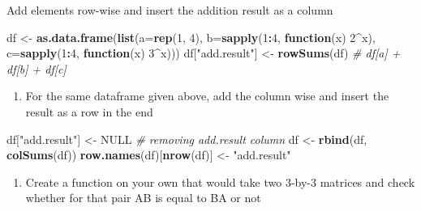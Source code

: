 \documentclass[]{article}
\newenvironment{Shaded}{\begin{snugshade}}{\end{snugshade}}
\newcommand{\CommentTok}[1]{\textcolor[rgb]{0.56,0.35,0.01}{\textit{#1}}}
\newcommand{\ControlFlowTok}[1]{\textcolor[rgb]{0.13,0.29,0.53}{\textbf{#1}}}
\newcommand{\DataTypeTok}[1]{\textcolor[rgb]{0.13,0.29,0.53}{#1}}
\newcommand{\DecValTok}[1]{\textcolor[rgb]{0.00,0.00,0.81}{#1}}
\newcommand{\KeywordTok}[1]{\textcolor[rgb]{0.13,0.29,0.53}{\textbf{#1}}}
\newcommand{\NormalTok}[1]{#1}
\newcommand{\OperatorTok}[1]{\textcolor[rgb]{0.81,0.36,0.00}{\textbf{#1}}}
\newcommand{\OtherTok}[1]{\textcolor[rgb]{0.56,0.35,0.01}{#1}}
\newcommand{\StringTok}[1]{\textcolor[rgb]{0.31,0.60,0.02}{#1}}
\providecommand{\tightlist}{%
  \setlength{\itemsep}{0pt}\setlength{\parskip}{0pt}}
\begin{document}
Add elements row-wise and insert the addition result as a column

\begin{Shaded}
\begin{Highlighting}[]
\NormalTok{df <-}\StringTok{ }\KeywordTok{as.data.frame}\NormalTok{(}\KeywordTok{list}\NormalTok{(}\DataTypeTok{a=}\KeywordTok{rep}\NormalTok{(}\DecValTok{1}\NormalTok{, }\DecValTok{4}\NormalTok{), }\DataTypeTok{b=}\KeywordTok{sapply}\NormalTok{(}\DecValTok{1}\OperatorTok{:}\DecValTok{4}\NormalTok{, }\ControlFlowTok{function}\NormalTok{(x) }\DecValTok{2}\OperatorTok{^}\NormalTok{x),}
                         \DataTypeTok{c=}\KeywordTok{sapply}\NormalTok{(}\DecValTok{1}\OperatorTok{:}\DecValTok{4}\NormalTok{, }\ControlFlowTok{function}\NormalTok{(x) }\DecValTok{3}\OperatorTok{^}\NormalTok{x)))}
\NormalTok{df[}\StringTok{"add.result"}\NormalTok{] <-}\StringTok{ }\KeywordTok{rowSums}\NormalTok{(df) }\CommentTok{# df[a] + df[b] + df[c]}
\end{Highlighting}
\end{Shaded}

\begin{enumerate}
\def\labelenumi{\arabic{enumi}.}
\setcounter{enumi}{7}
\tightlist
\item
  For the same dataframe given above, add the column wise and insert the
  result as a row in the end
\end{enumerate}

\begin{Shaded}
\begin{Highlighting}[]
\NormalTok{df[}\StringTok{"add.result"}\NormalTok{] <-}\StringTok{ }\OtherTok{NULL} \CommentTok{# removing add.result column}
\NormalTok{df <-}\StringTok{ }\KeywordTok{rbind}\NormalTok{(df, }\KeywordTok{colSums}\NormalTok{(df))}
\KeywordTok{row.names}\NormalTok{(df)[}\KeywordTok{nrow}\NormalTok{(df)] <-}\StringTok{ "add.result"}
\end{Highlighting}
\end{Shaded}

\begin{enumerate}
\def\labelenumi{\arabic{enumi}.}
\setcounter{enumi}{8}
\tightlist
\item
  Create a function on your own that would take two 3-by-3 matrices and
  check whether for that pair AB is equal to BA or not
\end{enumerate}

\begin{Shaded}
\end{Shaded}
\end{document}

